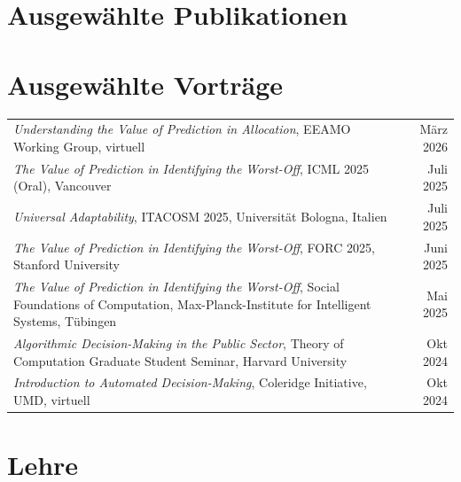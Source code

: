 \documentclass[margin,line, 10pt]{res}
\begin{document}
\begin{resume}
		
		\section{\sc Ausgew\"ahlte Publikationen}
		
		\nocite{*}
		\printbibliography[heading=none]
		
		
		\section{\sc Ausgew\"ahlte Vortr\"age}
		
		\begin{tabular*}{\textwidth}{@{\extracolsep{\fill}}p{}r@{}}
			\emph{Understanding the Value of Prediction in Allocation}, EEAMO Working Group, virtuell & M\"arz 2026 \\
			\emph{The Value of Prediction in Identifying the Worst-Off}, ICML 2025 (Oral), Vancouver & Juli 2025 \\
			\emph{Universal Adaptability}, ITACOSM 2025, Universit\"at Bologna, Italien & Juli 2025 \\
			\emph{The Value of Prediction in Identifying the Worst-Off}, FORC 2025, Stanford University & Juni 2025 \\
			\emph{The Value of Prediction in Identifying the Worst-Off}, Social Foundations of Computation, Max-Planck-Institute for Intelligent Systems, T\"ubingen & Mai 2025 \\
			\emph{Algorithmic Decision-Making in the Public Sector}, Theory of Computation Graduate Student Seminar, Harvard University& Okt 2024 \\
			\emph{Introduction to Automated Decision-Making}, Coleridge Initiative, UMD, virtuell & Okt 2024
		\end{tabular*}
		
		\section{\sc Lehre}
		

\end{resume}
\end{document}
